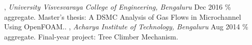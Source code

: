 , \textit{University Visvesvaraya College of Engineering, Bengaluru} \hfill Dec 2016
\% aggregate. Master’s thesis: A DSMC Analysis of Gas Flows in Microchannel Using OpenFOAM\@..
\newline\newline
{}, \textit{Acharya Institute of Technology, Bengaluru} \hfill Aug 2014
\% aggregate. Final-year project: Tree Climber Mechanism.
